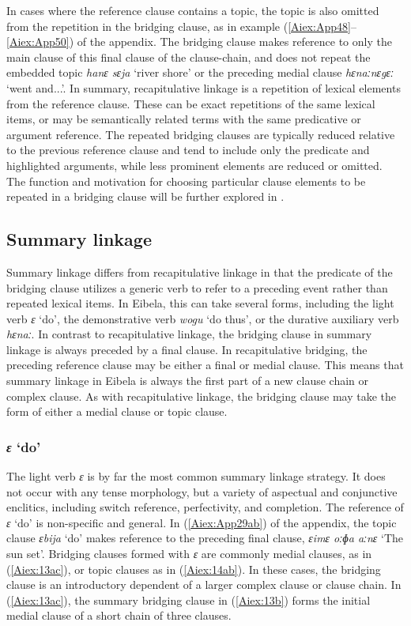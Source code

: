 \documentclass[output=paper]{LSP/langsci}
\begin{document}
In cases where the reference clause contains a topic, the topic is also omitted from the repetition in the bridging clause, as in example (\ref{Aiex:App48}--\ref{Aiex:App50}) of the appendix. The bridging clause makes reference to only the main clause of this final clause of the clause-chain, and does not repeat the embedded topic \textit{hanɛ sɛja} `river shore' or the preceding medial clause \textit{hɛnaːnɛgɛː} `went and...'. In summary, recapitulative linkage is a repetition of lexical elements from the reference clause. These can be exact repetitions of the same lexical items, or may be semantically related terms with the same predicative or argument reference. The repeated bridging clauses are typically reduced relative to the previous reference clause and tend to include only the predicate and highlighted arguments, while less prominent elements are reduced or omitted. The function and motivation for choosing particular clause elements to be repeated in a bridging clause will be further explored in .


\subsection{Summary linkage} 
\label{AiSum.linkg}
Summary linkage differs from recapitulative linkage in that the predicate of the bridging clause utilizes a generic verb to refer to a preceding event rather than repeated lexical items. In Eibela, this can take several forms, including the light verb \textit{ɛ} `do', the demonstrative verb \textit{wogu} `do thus', or the durative auxiliary verb \textit{hɛnaː}. In contrast to recapitulative linkage, the bridging clause in summary linkage is always preceded by a final clause. In recapitulative bridging, the preceding reference clause may be either a final or medial clause. This means that summary linkage in Eibela is always the first part of a new clause chain or complex clause. As with recapitulative linkage, the bridging clause may take the form of either a medial clause or topic clause.

\subsubsection{\textit{ɛ} `do'} 
\label{Ailightverb.do}
	The light verb \textit{ɛ} is by far the most common summary linkage strategy. It does not occur with any tense morphology, but a variety of aspectual and conjunctive enclitics, including switch reference, perfectivity, and completion. The reference of \textit{ɛ} `do' is non-specific and general. In (\ref{Aiex:App29ab}) of the appendix, the topic clause \textit{ɛbija} ‘do’ makes reference to the preceding final clause, \textit{ɛimɛ oːɸa aːnɛ} `The sun set'.
Bridging clauses formed with \textit{ɛ} are commonly medial clauses, as in (\ref{Aiex:13ac}), or topic clauses as in
(\ref{Aiex:14ab}). In these cases, the bridging clause is an introductory dependent of a larger complex clause or clause chain. In (\ref{Aiex:13ac}), the summary bridging clause in (\ref{Aiex:13b}) forms the initial medial clause of a short chain of three clauses.
\end{document}
